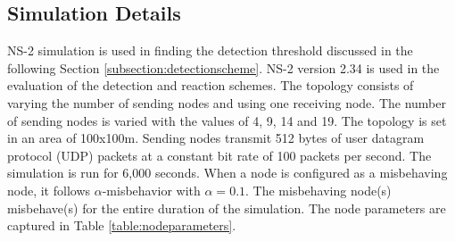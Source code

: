 \documentclass[12pt,letterpaper,english]{article}
\begin{document}
\subsection{Simulation Details}
\label{subsection:simulationdetails}
\indent NS-2 simulation is used in finding the detection threshold discussed in the following Section \ref{subsection:detectionscheme}.
NS-2 version 2.34 is used in the evaluation of the detection and reaction schemes.
The topology consists of varying the number of sending nodes and using one receiving node. The number of sending nodes is varied with the values of 4, 9, 14 and 19. The topology is set in an area of 100x100m. 
Sending nodes transmit 512 bytes of user datagram protocol (UDP) packets at a constant bit rate of 100 packets per second. The simulation is run for 6,000 seconds.
When a node is configured as a misbehaving node, it follows $\alpha$-misbehavior with $\alpha = 0.1$. The misbehaving node(s) misbehave(s) for the entire duration of the simulation. The node parameters are captured in Table  \ref{table:nodeparameters}.
\end{document}
